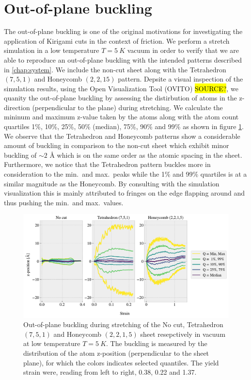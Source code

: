 \section{Out-of-plane buckling}
The out-of-plane buckling is one of the original motivations for investigating
the application of Kirigami cuts in the context of friction. We perform a
stretch simulation in a low temperature $T = \SI{5}{K}$ vacuum in order to
verify that we are able to reproduce an out-of-plane buckling with the intended
patterns described in \cref{chap:system}. We include the non-cut sheet along
with the Tetrahedron $(7,5,1)$ and Honeycomb $(2,2,15)$ pattern. Depsite a
visual inspection of the simulation results, using the Open Visualization Tool (OVITO) \hl{SOURCE?}, we quanity the out-of-plane buckling
by assessing the distirbution of atoms in the z-direction (perpendicular to the plane) during stretching. We calculate the mininum and maximum z-value taken by the atoms along with the atom count quartiles 1\%, 10\%, 25\%, 50\% (median), 75\%, 90\% and 99\% as shown in figure \cref{fig:buckling_quartiles}. We observe that the Tetrahedron and Honeycomb patterns show a considerable amount of buckling in comparison to the non-cut sheet which exhibit minor buckling of $\sim 2$ Å which is on the same order as the
atomic spacing in the sheet. Furthermore, we notice that the Tetrahedron pattern
buckles more in consideration to the min.\ and max.\ peaks while the 1\% and 99\%
quartiles is at a similar magnitude as the Honeycomb. By consulting with the simulation visualization this is mainly attributed to fringes on the edge flapping around and thus pushing the min.\ and max.\ values.


\begin{figure}[H]
  \centering
  \includegraphics[width=\linewidth]{figures/baseline/vacuum_normal_buckling}
  \caption{Out-of-plane buckling during stretching of the No cut, Tetrahedron $(7,5,1)$ and Honeycomb $(2,2,1,5)$ sheet resepctively in vacuum at low temperature $T = \SI{5}{K}$. The buckling is measured by the distribution of the atom z-position (perpendicular to the sheet plane), for which the colors indicates selected quantiles. The yield strain were, reading from left to right, 0.38, 0.22 and 1.37.}
  \label{fig:buckling_quartiles}
\end{figure}

